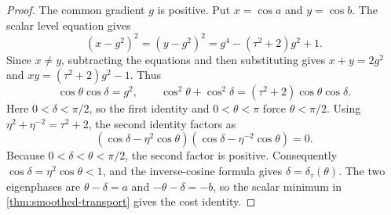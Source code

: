 \begin{proof}
The common gradient $g$ is positive. Put $x=\cos a$ and $y=\cos b$.
The scalar level equation gives
\[
 (x-g^2)^2=(y-g^2)^2=g^4-(\tau^2+2)g^2+1.
\]
Since $x\ne y$, subtracting the equations and then substituting gives
$x+y=2g^2$ and $xy=(\tau^2+2)g^2-1$. Thus
\[
 \cos\theta\cos\delta=g^2,\qquad
 \cos^2\theta+\cos^2\delta
       =(\tau^2+2)\cos\theta\cos\delta.
\]
Here $0<\delta<\pi/2$, so the first identity and $0<\theta<\pi$
force $\theta<\pi/2$. Using $\eta^2+\eta^{-2}=\tau^2+2$, the second
identity factors as
\[
 (\cos\delta-\eta^2\cos\theta)
 (\cos\delta-\eta^{-2}\cos\theta)=0.
\]
Because $0<\delta<\theta<\pi/2$, the second factor is positive.
Consequently $\cos\delta=\eta^2\cos\theta<1$, and the inverse-cosine
formula gives $\delta=\delta_\tau(\theta)$. The two eigenphases are
$\theta-\delta=a$ and $-\theta-\delta=-b$, so the scalar minimum in
\cref{thm:smoothed-transport} gives the cost identity.
\end{proof}

